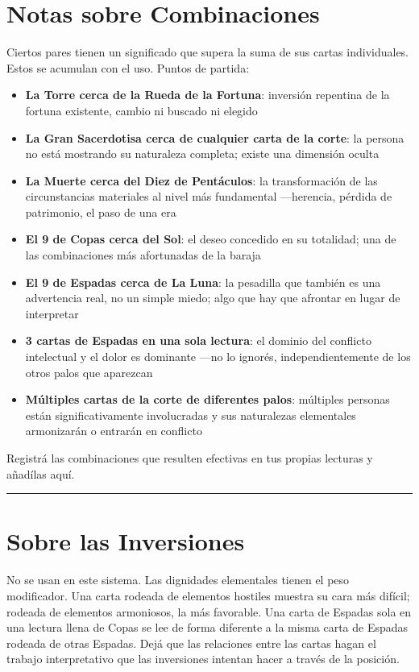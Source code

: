 \section{Notas sobre Combinaciones}\label{notes-on-combinations}

Ciertos pares tienen un significado que supera la suma de sus cartas individuales. Estos se acumulan con el uso. Puntos de partida:

\begin{itemize}
\tightlist
\item
  \textbf{La Torre cerca de la Rueda de la Fortuna}: inversión repentina de la fortuna existente, cambio ni buscado ni elegido
\item
  \textbf{La Gran Sacerdotisa cerca de cualquier carta de la corte}: la persona no está mostrando su naturaleza completa; existe una dimensión oculta
\item
  \textbf{La Muerte cerca del Diez de Pentáculos}: la transformación de las circunstancias materiales al nivel más fundamental ---herencia, pérdida de patrimonio, el paso de una era
\item
  \textbf{El 9 de Copas cerca del Sol}: el deseo concedido en su totalidad; una de las combinaciones más afortunadas de la baraja
\item
  \textbf{El 9 de Espadas cerca de La Luna}: la pesadilla que también es una advertencia real, no un simple miedo; algo que hay que afrontar en lugar de interpretar
\item
  \textbf{3 cartas de Espadas en una sola lectura}: el dominio del conflicto intelectual y el dolor es dominante ---no lo ignorés, independientemente de los otros palos que aparezcan
\item
  \textbf{Múltiples cartas de la corte de diferentes palos}: múltiples personas están significativamente involucradas y sus naturalezas elementales armonizarán o entrarán en conflicto
\end{itemize}

Registrá las combinaciones que resulten efectivas en tus propias lecturas y añadílas aquí.

\begin{center}\rule{0.5\linewidth}{0.5pt}\end{center}

\section{Sobre las Inversiones}\label{on-reversals}

No se usan en este sistema. Las dignidades elementales tienen el peso modificador. Una carta rodeada de elementos hostiles muestra su cara más difícil; rodeada de elementos armoniosos, la más favorable. Una carta de Espadas sola en una lectura llena de Copas se lee de forma diferente a la misma carta de Espadas rodeada de otras Espadas. Dejá que las relaciones entre las cartas hagan el trabajo interpretativo que las inversiones intentan hacer a través de la posición.
